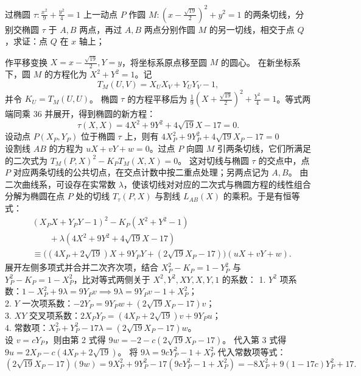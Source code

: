 \begin{example}
过椭圆 $\tau: \frac{x^2}{9} + \frac{y^2}{4} = 1$ 上一动点 $P$ 作圆 $M: \left(x-\frac{\sqrt{19}}{2}\right)^2 + y^2 = 1$ 的两条切线，分别交椭圆 $\tau$ 于 $A,B$ 两点，再过 $A,B$ 两点分别作圆 $M$ 的另一切线，相交于点 $Q$，求证：点 $Q$ 在 $x$ 轴上；
\end{example}
\begin{solution}
作平移变换 $X = x - \frac{\sqrt{19}}{2}, Y = y$，将坐标系原点移至圆 $M$ 的圆心。
在新坐标系下，圆 $M$ 的方程化为 $X^2 + Y^2 = 1$。记
\[
T_M(U, V) = X_U X_V + Y_U Y_V - 1,
\]
并令 $K_U = T_M(U, U)$。
椭圆 $\tau$ 的方程平移后为 $\frac{1}{9}\left(X + \frac{\sqrt{19}}{2}\right)^2 + \frac{Y^2}{4} = 1$。等式两端同乘 $36$ 并展开，得到椭圆的新方程：
\[ \tau(X, X) = 4X^2 + 9Y^2 + 4\sqrt{19}X - 17 = 0. \]
设动点 $P(X_P, Y_P)$ 位于椭圆 $\tau$ 上，则有 $4X_P^2 + 9Y_P^2 + 4\sqrt{19} X_P - 17 = 0$\\
设割线 $AB$ 的方程为 $uX + vY + w = 0$。过点 $P$ 向圆 $M$ 引两条切线，它们所满足的二次式为 $T_M(P, X)^2 - K_P T_M(X, X) = 0$。
这对切线与椭圆 $\tau$ 的交点中，点 $P$ 对应两条切线的公共切点，在交点计数中按二重点处理；另两点记为 $A, B$。
由二次曲线系，可设存在实常数 $\lambda$，使该切线对对应的二次式与椭圆方程的线性组合分解为椭圆在点 $P$ 处的切线 $T_\tau(P, X)$ 与割线 $L_{AB}(X)$ 的乘积。于是有恒等式：
\[
\begin{aligned}
&(X_P X + Y_P Y - 1)^2 - K_P(X^2 + Y^2 - 1) \\
&\qquad + \lambda(4X^2 + 9Y^2 + 4\sqrt{19} X - 17) \\
&\equiv \big((4X_P + 2\sqrt{19})X + 9Y_P Y + (2\sqrt{19} X_P - 17)\big)(uX + vY + w).
\end{aligned}
\]
展开左侧多项式并合并二次齐次项，结合 $X_P^2 - K_P = 1 - Y_P^2$ 与 $Y_P^2 - K_P = 1 - X_P^2$，比对等式两侧关于 $X^2, Y^2, XY, X, Y, 1$ 的系数：
1. $Y^2$ 项系数：$1 - X_P^2 + 9\lambda = 9Y_P v \implies 9\lambda = 9Y_P v - 1 + X_P^2$；\\
2. $Y$ 一次项系数：$-2Y_P = 9Y_P w + (2\sqrt{19} X_P - 17)v$；\\
3. $XY$ 交叉项系数：$2X_P Y_P = (4X_P + 2\sqrt{19})v + 9Y_P u$；\\
4. 常数项：$X_P^2 + Y_P^2 - 17\lambda = (2\sqrt{19} X_P - 17)w$。\\
设 $v = c Y_P$，则由第 2 式得 $9w = -2 - c(2\sqrt{19} X_P - 17)$。
代入第 3 式得 $9u = 2X_P - c(4X_P + 2\sqrt{19})$。
将 $9\lambda = 9c Y_P^2 - 1 + X_P^2$ 代入常数项等式：
\[ (2\sqrt{19} X_P - 17)(9w) = 9X_P^2 + 9Y_P^2 - 17(9c Y_P^2 - 1 + X_P^2) = -8X_P^2 + 9(1 - 17c)Y_P^2 + 17. \]

\end{solution}
